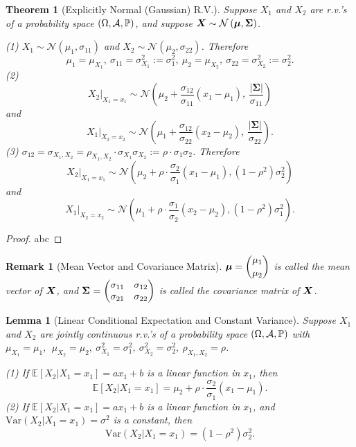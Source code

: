 \documentclass[openany,12pt]{book}
\newtheorem{theorem}{Theorem}[chapter]
\newtheorem{remark}{Remark}[chapter]
\newtheorem{lemma}{Lemma}[chapter]
\begin{document}
\begin{theorem}[Explicitly Normal (Gaussian) R.V.]
Suppose $X_{1}$ and $X_{2}$ are r.v.'s of a probability space $(\Omega,\mathcal{A},\mathbb{P})$, and suppose $\bm{X}\sim \mathcal{N}\left(\bm{\mu},\bm{\Sigma} \right)$.

(1) $X_{1}\sim \mathcal{N}\left( \mu_{1},\sigma_{11} \right)$ and
$X_{2}\sim \mathcal{N}\left( \mu_{2},\sigma_{22} \right)$. Therefore
\[\mu_{1} = \mu_{X_{1}},\ \sigma_{11} = \sigma_{X_{1}}^{2} := \sigma_{1}^{2},\ \mu_{2} = \mu_{X_{2}},\ \sigma_{22} = \sigma_{X_{2}}^{2} := \sigma_{2}^{2}.\]
(2)
\[X_{2}|_{X_{1} = x_{1}}\sim \mathcal{N}\left( \mu_{2} + \frac{\sigma_{12}}{\sigma_{11}}\left( x_{1} - \mu_{1} \right),\ \frac{\left| \bm{\Sigma} \right|}{\sigma_{11}} \right)\]
and
\[X_{1}|_{X_{2} = x_{2}}\sim \mathcal{N}\left( \mu_{1} + \frac{\sigma_{12}}{\sigma_{22}}\left( x_{2} - \mu_{2} \right),\ \frac{\left|\bm{\Sigma}\right|}{\sigma_{22}} \right).\]
(3)
$\sigma_{12} = \sigma_{X_{1},X_{2}} = \rho_{X_{1},X_{2}} \cdot \sigma_{X_{1}}\sigma_{X_{2}} := \rho \cdot \sigma_{1}\sigma_{2}$. Therefore
\[X_{2}|_{X_{1} = x_{1}}\sim \mathcal{N}\left( \mu_{2} + \rho\cdot\frac{\sigma_{2}}{\sigma_{1}}\left( x_{1} - \mu_{1} \right),\left(1 - \rho^{2}\right)\sigma_{2}^{2} \right)\]
and
\[X_{1}|_{X_{2} = x_{2}}\sim \mathcal{N}\left( \mu_{1} + \rho\cdot\frac{\sigma_{1}}{\sigma_{2}}\left( x_{2} - \mu_{2} \right),\left(1 - \rho^{2}\right)\sigma_{1}^{2} \right).\]
\end{theorem}

\begin{proof}
  abc
\end{proof}

\begin{remark}[Mean Vector and Covariance Matrix]
$\displaystyle\bm{\mu}= \binom{\mu_{1}}{\mu_{2}}$ is called the mean vector of $\bm{X}$, and $\displaystyle\bm{\Sigma}_{}^{} = \begin{pmatrix}
\sigma_{11} & \sigma_{12} \\
\sigma_{21} & \sigma_{22} \\
\end{pmatrix}$ is called the covariance matrix of $\bm{X}$.
\end{remark}

\begin{lemma}[Linear Conditional Expectation and Constant Variance]
Suppose $X_{1}$ and $X_{2}$ are jointly continuous r.v.'s of a probability
space $(\Omega,\mathcal{A},\mathbb{P})$ with $\mu_{X_{1}} = \mu_{1},\ \ \mu_{X_{2}} = \mu_{2},\ \sigma_{X_{1}}^{2} = \sigma_{1}^{2},\ \sigma_{X_{2}}^{2} = \sigma_{2}^{2},\ \rho_{X_{1},X_{2}} = \rho$.

(1) If
$\mathbb{E}[ X_{2} | X_{1} = x_{1}] = ax_{1} + b$
is a linear function in $x_{1}$, then
\[\mathbb{E}[ X_{2} | X_{1} = x_{1}] = \mu_{2} + \rho\cdot\frac{\sigma_{2}}{\sigma_{1}}\left( x_{1} - \mu_{1} \right).\]
(2) If
$\mathbb{E}[ X_{2} | X_{1} = x_{1}]= ax_{1} + b$
is a linear function in $x_{1}$, and
$\mathrm{Var}( X_{2}| X_{1} = x_{1} ) = \sigma^{2}$
is a constant, then
\[\mathrm{Var}( X_{2} | X_{1} = x_{1} ) = \left( 1 - \rho^{2} \right)\sigma_{2}^{2}.\]
\end{lemma}
\end{document}
